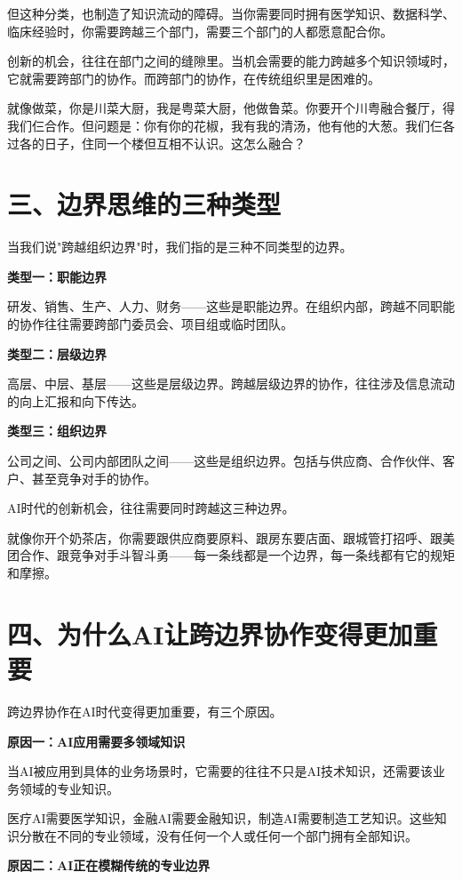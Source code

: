 但这种分类，也制造了知识流动的障碍。当你需要同时拥有医学知识、数据科学、临床经验时，你需要跨越三个部门，需要三个部门的人都愿意配合你。

创新的机会，往往在部门之间的缝隙里。当机会需要的能力跨越多个知识领域时，它就需要跨部门的协作。而跨部门的协作，在传统组织里是困难的。

就像做菜，你是川菜大厨，我是粤菜大厨，他做鲁菜。你要开个川粤融合餐厅，得我们仨合作。但问题是：你有你的花椒，我有我的清汤，他有他的大葱。我们仨各过各的日子，住同一个楼但互相不认识。这怎么融合？

\section{三、边界思维的三种类型}


当我们说"跨越组织边界"时，我们指的是三种不同类型的边界。

\textbf{类型一：职能边界}

研发、销售、生产、人力、财务——这些是职能边界。在组织内部，跨越不同职能的协作往往需要跨部门委员会、项目组或临时团队。

\textbf{类型二：层级边界}

高层、中层、基层——这些是层级边界。跨越层级边界的协作，往往涉及信息流动的向上汇报和向下传达。

\textbf{类型三：组织边界}

公司之间、公司内部团队之间——这些是组织边界。包括与供应商、合作伙伴、客户、甚至竞争对手的协作。

AI时代的创新机会，往往需要同时跨越这三种边界。

就像你开个奶茶店，你需要跟供应商要原料、跟房东要店面、跟城管打招呼、跟美团合作、跟竞争对手斗智斗勇——每一条线都是一个边界，每一条线都有它的规矩和摩擦。

\section{四、为什么AI让跨边界协作变得更加重要}


跨边界协作在AI时代变得更加重要，有三个原因。

\textbf{原因一：AI应用需要多领域知识}

当AI被应用到具体的业务场景时，它需要的往往不只是AI技术知识，还需要该业务领域的专业知识。

医疗AI需要医学知识，金融AI需要金融知识，制造AI需要制造工艺知识。这些知识分散在不同的专业领域，没有任何一个人或任何一个部门拥有全部知识。

\textbf{原因二：AI正在模糊传统的专业边界}

